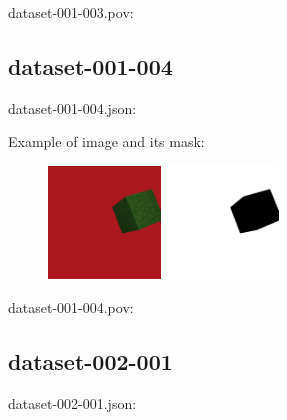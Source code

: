 dataset-001-003.pov:
\begin{scriptsize}
\begin{ttfamily}

\end{ttfamily}
\end{scriptsize}

\subsection{dataset-001-004}

dataset-001-004.json:
\begin{scriptsize}
\begin{ttfamily}

\end{ttfamily}
\end{scriptsize}

Example of image and its mask:
\begin{center}
\begin{figure}[H]
\centering\includegraphics[width=3cm]{./img-001-004.png}
\centering\includegraphics[width=3cm]{./mask-001-004.png}
\end{figure}
\end{center}

dataset-001-004.pov:
\begin{scriptsize}
\begin{ttfamily}

\end{ttfamily}
\end{scriptsize}

\subsection{dataset-002-001}

dataset-002-001.json:
\begin{scriptsize}
\begin{ttfamily}

\end{ttfamily}
\end{scriptsize}


